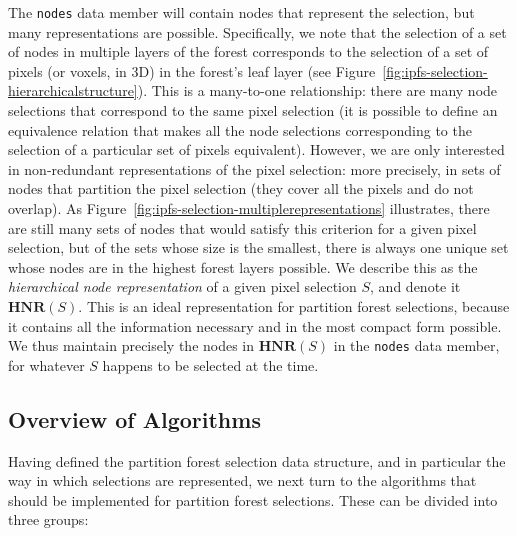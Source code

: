 \noindent The \texttt{nodes} data member will contain nodes that represent the selection, but many representations are possible. Specifically, we note that the selection of a set of nodes in multiple layers of the forest corresponds to the selection of a set of pixels (or voxels, in 3D) in the forest's leaf layer (see Figure~\ref{fig:ipfs-selection-hierarchicalstructure}). This is a many-to-one relationship: there are many node selections that correspond to the same pixel selection (it is possible to define an equivalence relation that makes all the node selections corresponding to the selection of a particular set of pixels equivalent). However, we are only interested in non-redundant representations of the pixel selection: more precisely, in sets of nodes that partition the pixel selection (they cover all the pixels and do not overlap). As Figure~\ref{fig:ipfs-selection-multiplerepresentations} illustrates, there are still many sets of nodes that would satisfy this criterion for a given pixel selection, but of the sets whose size is the smallest, there is always one unique set whose nodes are in the highest forest layers possible. We describe this as the \emph{hierarchical node representation} of a given pixel selection $S$, and denote it $\textbf{HNR}(S)$. This is an ideal representation for partition forest selections, because it contains all the information necessary and in the most compact form possible. We thus maintain precisely the nodes in $\textbf{HNR}(S)$ in the \texttt{nodes} data member, for whatever $S$ happens to be selected at the time.


\subsection{Overview of Algorithms}


Having defined the partition forest selection data structure, and in particular the way in which selections are represented, we next turn to the algorithms that should be implemented for partition forest selections. These can be divided into three groups:

